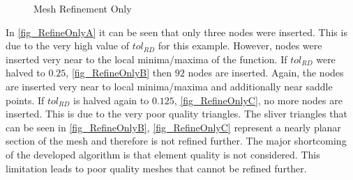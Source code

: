 \begin{figure}[h!]
  \begin{center}


  \caption{Mesh Refinement Only}
  \label{fig_RefineOnly}
  \end{center}
\end{figure}

In \ref{fig_RefineOnlyA} it can be seen that only three nodes were
inserted. This is due to the very high value of $tol_{RD}$ for this
example.  However, nodes were inserted very near
to the local minima/maxima of the function. If $tol_{RD}$ were halved to
$0.25$, \ref{fig_RefineOnlyB} then $92$ nodes are inserted. Again, the
nodes are inserted very near to local minima/maxima and additionally
near saddle points. If $tol_{RD}$ is halved again to $0.125$,
\ref{fig_RefineOnlyC}, no more nodes are inserted. This is due to the
very poor quality triangles.  The sliver triangles that can be seen in
\ref{fig_RefineOnlyB}, \ref{fig_RefineOnlyC} represent a nearly planar 
section of the mesh and therefore is not refined further.  The 
major shortcoming of the developed algorithm is that element quality is 
not considered.  This limitation leads to poor quality meshes that 
cannot be refined further.

